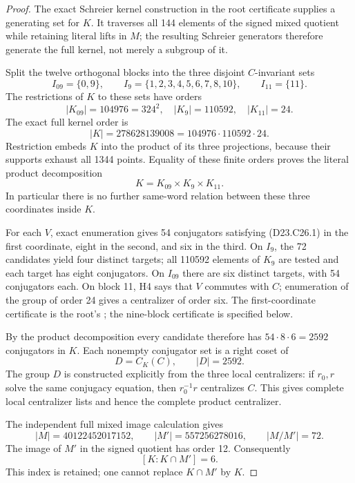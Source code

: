 \begin{proof}
The exact Schreier kernel construction in the root certificate
 supplies a
generating set for $K$.  It traverses all 144 elements of the
signed mixed quotient while retaining literal lifts in $M$;
the resulting Schreier generators therefore generate the full
kernel, not merely a subgroup of it.

Split the twelve orthogonal blocks into the three disjoint
$C$-invariant sets
\[
       I_{09}=\{0,9\},\qquad
       I_9=\{1,2,3,4,5,6,7,8,10\},\qquad I_{11}=\{11\}.
\]
The restrictions of $K$ to these sets have orders
\[
       |K_{09}|=104976=324^2,\quad
       |K_9|=110592,\quad |K_{11}|=24.
\]
The exact full kernel order is
\[
 |K|=278628139008=104976\cdot110592\cdot24.
\]
Restriction embeds $K$ into the product of its three
projections, because their supports exhaust all 1344 points.
Equality of these finite orders proves the literal product
decomposition
\[
                       K=K_{09}\times K_9\times K_{11}.
                                                               \tag{D23.C26.2}
\]
In particular there is no further same-word relation between
these three coordinates inside $K$.

For each $V$, exact enumeration gives 54 conjugators satisfying
(D23.C26.1) in the first coordinate, eight in the second, and
six in the third.  On $I_9$, the 72 candidates yield four
distinct targets; all 110592 elements of $K_9$ are tested and
each target has eight conjugators.  On $I_{09}$ there are six
distinct targets, with 54 conjugators each.  On block 11, H4
says that $V$ commutes with $C$; enumeration of the group of
order 24 gives a centralizer of order six.  The first-coordinate
certificate is the root's
;
the nine-block certificate is specified below.

By the product decomposition every candidate therefore has
$54\cdot8\cdot6=2592$ conjugators in $K$.  Each nonempty
conjugator set is a right coset of
\[
                    D=C_K(C),\qquad |D|=2592.              \tag{D23.C26.3}
\]
The group $D$ is constructed explicitly from the three local
centralizers: if $r_0,r$ solve the same conjugacy equation,
then $r_0^{-1}r$ centralizes $C$.  This gives complete local
centralizer lists and hence the complete product centralizer.

The independent full mixed image calculation gives
\[
       |M|=40122452017152,\qquad |M'|=557256278016,
       \qquad |M/M'|=72.
\]
The image of $M'$ in the signed quotient has order 12.
Consequently
\[
               [K:K\cap M']=6.                            \tag{D23.C26.4}
\]
This index is retained; one cannot replace $K\cap M'$ by $K$.


\end{proof}
